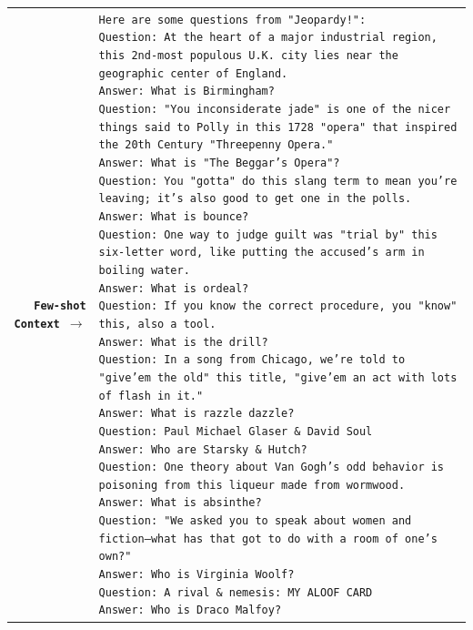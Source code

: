 \documentclass[11pt]{article}
\begin{document}
\begin{table}[t]
\centering
\footnotesize
\begin{adjustbox}{height=4.1in}
\begin{tabularx}{1.11\textwidth}{rX}
 \toprule
 \textbf{\texttt{Few-shot Context $\rightarrow$}} & \texttt{Here are some questions from "Jeopardy!":\newline
Question: At the heart of a major industrial region, this 2nd-most populous U.K. city lies near the geographic center of England.\newline
Answer: What is Birmingham?\newline
Question: "You inconsiderate jade" is one of the nicer things said to Polly in this 1728 "opera" that inspired the 20th Century "Threepenny Opera."\newline
Answer: What is "The Beggar's Opera"?\newline
Question: You "gotta" do this slang term to mean you're leaving; it's also good to get one in the polls.\newline
Answer: What is bounce?\newline
Question: One way to judge guilt was "trial by" this six-letter word, like putting the accused's arm in boiling water.\newline
Answer: What is ordeal?\newline
Question: If you know the correct procedure, you "know" this, also a tool.\newline
Answer: What is the drill?\newline
Question: In a song from Chicago, we're told to "give'em the old" this title, "give'em an act with lots of flash in it."\newline
Answer: What is razzle dazzle?\newline
Question: Paul Michael Glaser \& David Soul\newline
Answer: Who are Starsky \& Hutch?\newline
Question: One theory about Van Gogh’s odd behavior is poisoning from this liqueur made from wormwood.\newline
Answer: What is absinthe?\newline
Question: "We asked you to speak about women and fiction--what has that got to do with a room of one’s own?"\newline
Answer: Who is Virginia Woolf?\newline
Question: A rival \& nemesis: MY ALOOF CARD\newline
Answer: Who is Draco Malfoy?\newline
}
\end{tabularx}
\end{adjustbox}
\end{table}
\end{document}
